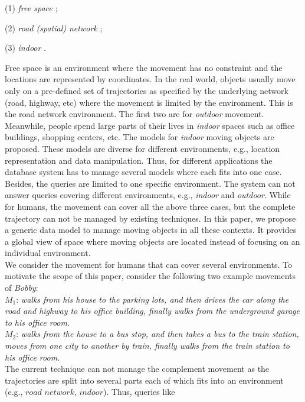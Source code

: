 (1) \textit{free space} \cite{PO+97,WX+98,FG+00,GBE+00,GRS00}; 

(2) \textit{road (spatial) network} \cite{VW01,HJ2003,SJ2003,GA2006}; 

(3) \textit{indoor} \cite{JLY109,JLY209}. 

Free space is an environment where the movement has no 
constraint and the locations are represented by coordinates. In the real world, objects usually
move only on a pre-defined set of trajectories as specified by the underlying network 
(road, highway, etc) where the movement is limited by the environment. This is the road network environment. The first two are for \textit{outdoor} movement. Meanwhile, people spend large parts of their lives in \textit{indoor} spaces such as office buildings, shopping centers, etc. The models for \textit{indoor} moving objects are proposed. These models are diverse for different environments, e.g., 
location representation and data manipulation. Thus, for different applications the 
database system has to manage several models where each fits into one case. Besides,  
the queries are limited to one specific environment. The system can not answer queries covering different environments, e.g., \textit{indoor} and \textit{outdoor}. While for humans, the 
movement can cover all the above three cases, but the complete trajectory can not 
be managed by existing techniques. In this paper, we propose 
a generic data model to manage moving objects in all these contexts. It provides a global
view of space where moving objects are located instead of focusing on an individual environment. \\


We consider the movement for humans that can cover several environments. To motivate the
scope of this paper, consider the following two example movements of \textit{Bobby}: \\

$M_1$:\textit{ walks from his house to the parking lots, and 
then drives the car along the road and highway to his office building, 
finally walks from the underground garage to his office room}. \\

$M_2$:\textit{ walks from the house to a bus stop, and 
then takes a bus to the train station, moves from one city to another by train,
finally walks from the train station to his office room}. \\

The current technique can not manage the complement movement as the trajectories are split 
into several parts each of which fits into an environment (e.g., $road$ $network$, $indoor$). 
Thus, queries like \\

